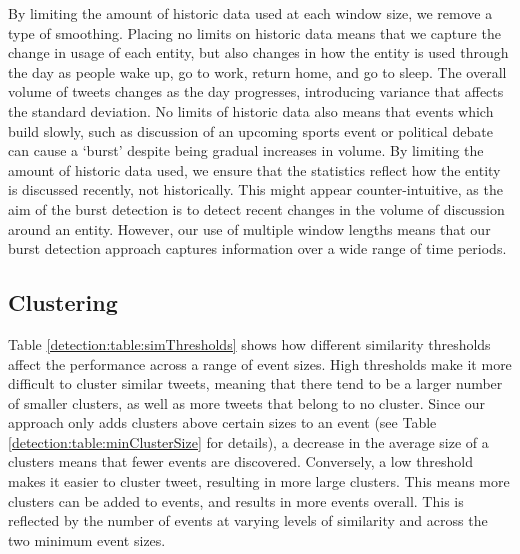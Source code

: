By limiting the amount of historic data used at each window size, we remove a type of smoothing.
Placing no limits on historic data means that we capture the change in usage of each entity, but also changes in how the entity is used through the day as people wake up, go to work, return home, and go to sleep.
The overall volume of tweets changes as the day progresses, introducing variance that affects the standard deviation.
No limits of historic data also means that events which build slowly, such as discussion of an upcoming sports event or political debate can cause a `burst' despite being gradual increases in volume.
By limiting the amount of historic data used, we ensure that the statistics reflect how the entity is discussed recently, not historically.
This might appear counter-intuitive, as the aim of the burst detection is to detect recent changes in the volume of discussion around an entity.
However, our use of multiple window lengths means that our burst detection approach captures information over a wide range of time periods.



\subsection{Clustering}
\label{detection:sec:simThresholds}
Table \ref{detection:table:simThresholds} shows how different similarity thresholds affect the performance across a range of event sizes.
High thresholds make it more difficult to cluster similar tweets, meaning that there tend to be a larger number of smaller clusters, as well as more tweets that belong to no cluster.
Since our approach only adds clusters above certain sizes to an event (see Table \ref{detection:table:minClusterSize} for details), a decrease in the average size of a clusters means that fewer events are discovered.
Conversely, a low threshold makes it easier to cluster tweet, resulting in more large clusters.
This means more clusters can be added to events, and results in more events overall.
This is reflected by the number of events at varying levels of similarity and across the two minimum event sizes.


